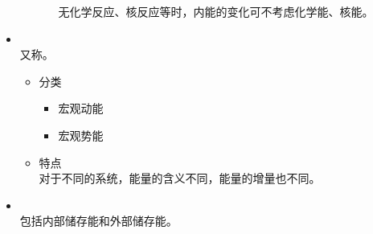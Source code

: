 \begin{itemize}
\begin{itemize}
\begin{itemize}
		\hspace*{2em} 无化学反应、核反应等时，内能的变化可不考虑化学能、核能。
	\end{itemize}
	\end{itemize}
	\item {}\\
		\hspace*{2em} 又称。
		\vspace*{-0.5em}
	\begin{itemize}
		\item 分类
		\begin{itemize}
			\item 宏观动能
			\item 宏观势能
		\end{itemize}
		\item 特点\\
			\hspace*{2em} 对于不同的系统，能量的含义不同，能量的增量也不同。
	\end{itemize}
	\item {}\\
		\hspace*{2em} 包括内部储存能和外部储存能。
\end{itemize}

